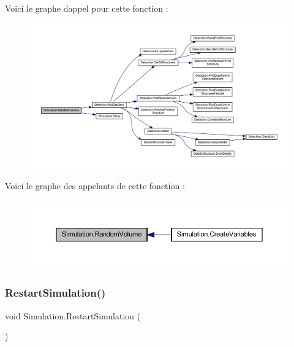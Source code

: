 Voici le graphe d\textquotesingle{}appel pour cette fonction \+:
\nopagebreak
\begin{figure}[H]
\begin{center}
\leavevmode
\includegraphics[width=350pt]{class_simulation_aff8ad1d9fe429a08bf0d42f52b08b71b_cgraph}
\end{center}
\end{figure}
Voici le graphe des appelants de cette fonction \+:
\nopagebreak
\begin{figure}[H]
\begin{center}
\leavevmode
\includegraphics[width=350pt]{class_simulation_aff8ad1d9fe429a08bf0d42f52b08b71b_icgraph}
\end{center}
\end{figure}
\mbox{\label{class_simulation_a500982098740ae238f349a6fed0affd8}} 
\subsubsection{\texorpdfstring{Restart\+Simulation()}{RestartSimulation()}}
{\footnotesize\ttfamily void Simulation.\+Restart\+Simulation (\begin{DoxyParamCaption}{ }\end{DoxyParamCaption})\hspace{0.3cm}{\ttfamily [inline]}}



